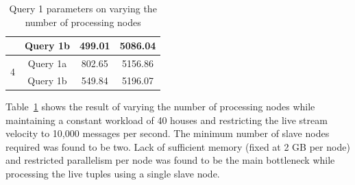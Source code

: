 \documentclass{sig-alternate}
\begin{document}
\begin{table}[!htbp]
\begin{tabular}{|c|c|c|c|}
                                                                  & Query 1b & 499.01                                                             & 5086.04                                                       \\ \hline
\multirow{2}{*}{4}                                                & Query 1a & 802.65                                                             & 5156.86                                                       \\ \cline{2-4} 
                                                                  & Query 1b & 549.84                                                             & 5196.07                                                       \\ \hline
\end{tabular}
\caption{\label{table:q1-nodes} Query 1 parameters on varying the number of processing nodes}
\end{table}
 
 Table~\ref{table:q1-nodes} shows the result of varying the number of processing nodes while maintaining a constant workload of 40 houses and restricting  the live stream velocity to 10,000 messages per second. The minimum number of slave nodes required was found to be two. Lack of sufficient memory (fixed at 2 GB per node) and restricted parallelism per node was found to be the main bottleneck while processing the live tuples using a single slave node.
 
 
 
\end{document}
